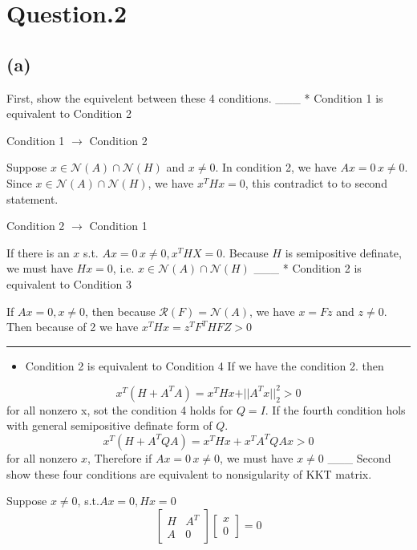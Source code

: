 \documentclass[11pt]{article}
\providecommand{\tightlist}{%
      \setlength{\itemsep}{0pt}\setlength{\parskip}{0pt}}
\begin{document}
    \section{Question.2}\label{question.2}

    \subsection{(a)}\label{a}

First, show the equivelent between these 4 conditions. \_\_\_ *
Condition 1 is equivalent to Condition 2

Condition 1 \(\rightarrow\) Condition 2

Suppose \(x \in \mathcal N(A) \cap \mathcal N(H)\) and \(x \neq 0\). In
condition 2, we have \(Ax = 0\, x \neq 0\). Since
\(x \in \mathcal N(A) \cap \mathcal N(H)\), we have \(x^THx = 0\), this
contradict to to second statement.

Condition 2 \(\rightarrow\) Condition 1

If there is an \(x\) s.t. \(Ax = 0\, x \neq 0, x^THX = 0\). Because
\(H\) is semipositive definate, we must have \(Hx = 0\), i.e.
\(x \in \mathcal N(A) \cap \mathcal N(H)\) \_\_\_ * Condition 2 is
equivalent to Condition 3

If \(Ax = 0, x \neq 0\), then because
\(\mathcal R(F) = \mathcal N (A)\), we have \(x = Fz\) and \(z \neq 0\).
Then because of 2 we have \(x^T Hx = z^TF^THFZ > 0\)

\begin{center}\rule{0.5\linewidth}{\linethickness}\end{center}

\begin{itemize}
\tightlist
\item
  Condition 2 is equivalent to Condition 4 If we have the condition 2.
  then
\end{itemize}

\[
x^T(H + A^TA) = x^THx + \vert\vert A^Tx\vert\vert^2_2 > 0
\] for all nonzero x, sot the condition 4 holds for \(Q = I\). If the
fourth condition hols with general semipositive definate form of \(Q\).
\[
x^T(H + A^TQA) = x^THx + x^TA^TQAx > 0
\] for all nonzero \(x\), Therefore if \(Ax = 0\, x \neq 0\), we must
have \(x\neq 0\) \_\_\_ Second show these four conditions are equivalent
to nonsigularity of KKT matrix.

Suppose \(x\neq 0\), s.t.\(Ax = 0, Hx = 0\) \[
\begin{bmatrix}
H & A^T\\
A & 0
\end{bmatrix}
\begin{bmatrix}
x\\
0
\end{bmatrix} = 0\]
\end{document}
